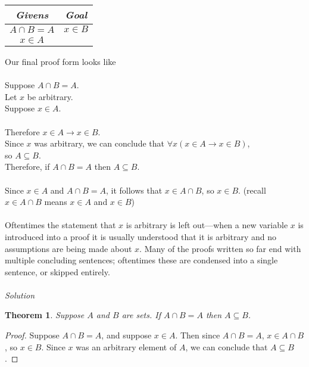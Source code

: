 \documentclass{report}
\newtheorem*{theorem}{Theorem}
\begin{document}
\begin{center}
\begin{tabular}{c|c}
\textit{Givens}&\textit{Goal}\\
\hline
$A\cap B=A$&$x\in B$\\
$x\in A$&
\end{tabular}
\end{center}
Our final proof form looks like\\
\vspace{1mm}\\
\indent Suppose $A\cap B=A$.\\
\indent\indent Let $x$ be arbitrary.\\
\indent\indent\indent Suppose $x\in A$.\\
\indent\indent\indent{}\\
\indent\indent\indent Therefore $x\in A\to x\in B$.\\
\indent\indent Since $x$ was arbitrary, we can conclude that $\forall x(x\in A\to x\in B)$,\\
\indent\indent so $A\subseteq B$.\\
\indent Therefore, if $A\cap B=A$ then $A\subseteq B$.\\
\vspace{1mm}\\
Since $x\in A$ and $A\cap B=A$, it follows that $x\in A\cap B$, so $x\in B$. (recall $x\in A\cap B$ means $x\in A$ and $x\in B$)\\
\vspace{1mm}\\
Oftentimes the statement that $x$ is arbitrary is left out---when a new variable $x$ is introduced into a proof it is usually understood that it is arbitrary and no assumptions are being made 
about $x$. Many of the proofs written so far end with multiple concluding sentences; oftentimes these are condensed into a single sentence, or skipped entirely.\\
\vspace{1mm}\\
\textit{Solution}
\begin{theorem}
Suppose $A$ and $B$ are sets. If $A\cap B=A$ then $A\subseteq B$.
\end{theorem}
\begin{proof}
Suppose $A\cap B=A$, and suppose $x\in A$. Then since $A\cap B=A$, $x\in A\cap B$, so $x\in B$. Since $x$ was an arbitrary element of $A$, we can conclude that $A\subseteq B$.
\end{proof}
\newpage
\end{document}
